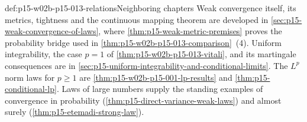 \begin{proofboundary}{def:p15-w02b-p15-013-relations}{Neighboring chapters}
Weak convergence itself, its metrics, tightness and the continuous
mapping theorem are developed in \cref{sec:p15-weak-convergence-of-laws},
where \cref{thm:p15-weak-metric-premises} proves the probability bridge
used in \cref{thm:p15-w02b-p15-013-comparison}~(4). Uniform
integrability, the case \(p=1\) of \cref{thm:p15-w02b-p15-013-vitali},
and its martingale consequences are in
\cref{sec:p15-uniform-integrability-and-conditional-limits}. The
\(L^p\) norm laws for \(p\geq1\) are \cref{thm:p15-w02b-p15-001-lp-results}
and \cref{thm:p15-conditional-lp}. Laws of large numbers supply the
standing examples of convergence in probability
(\cref{thm:p15-direct-variance-weak-laws}) and almost surely
(\cref{thm:p15-etemadi-strong-law}).
\end{proofboundary}
